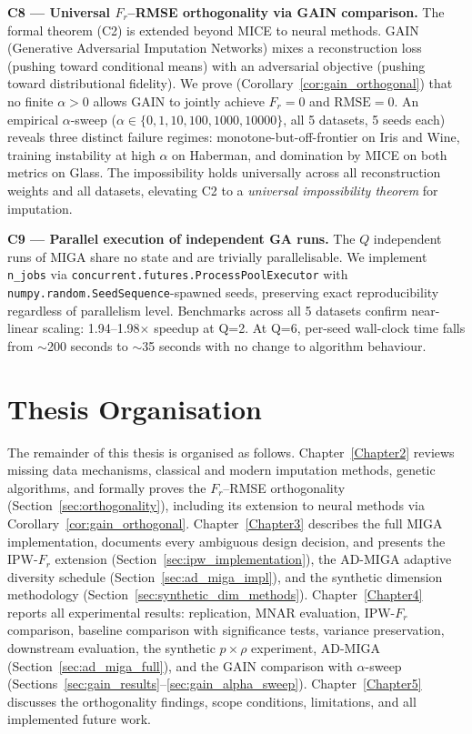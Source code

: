 \textbf{C8 --- Universal $F_r$--RMSE orthogonality via GAIN comparison.} The formal theorem (C2) is extended beyond MICE to neural methods. GAIN (Generative Adversarial Imputation Networks) mixes a reconstruction loss (pushing toward conditional means) with an adversarial objective (pushing toward distributional fidelity). We prove (Corollary~\ref{cor:gain_orthogonal}) that no finite $\alpha > 0$ allows GAIN to jointly achieve $F_r = 0$ and $\mathrm{RMSE} = 0$. An empirical $\alpha$-sweep ($\alpha \in \{0,1,10,100,1000,10000\}$, all 5 datasets, 5 seeds each) reveals three distinct failure regimes: monotone-but-off-frontier on Iris and Wine, training instability at high $\alpha$ on Haberman, and domination by MICE on both metrics on Glass. The impossibility holds universally across all reconstruction weights and all datasets, elevating C2 to a \emph{universal impossibility theorem} for imputation.

\textbf{C9 --- Parallel execution of independent GA runs.} The $Q$ independent runs of MIGA share no state and are trivially parallelisable. We implement \texttt{n\_jobs} via \texttt{concurrent.futures.ProcessPoolExecutor} with \texttt{numpy.random.SeedSequence}-spawned seeds, preserving exact reproducibility regardless of parallelism level. Benchmarks across all 5 datasets confirm near-linear scaling: 1.94--1.98$\times$ speedup at Q=2. At Q=6, per-seed wall-clock time falls from $\sim$200 seconds to $\sim$35 seconds with no change to algorithm behaviour.


\section{Thesis Organisation}

The remainder of this thesis is organised as follows. Chapter~\ref{Chapter2} reviews missing data mechanisms, classical and modern imputation methods, genetic algorithms, and formally proves the $F_r$--RMSE orthogonality (Section~\ref{sec:orthogonality}), including its extension to neural methods via Corollary~\ref{cor:gain_orthogonal}. Chapter~\ref{Chapter3} describes the full MIGA implementation, documents every ambiguous design decision, and presents the IPW-$F_r$ extension (Section~\ref{sec:ipw_implementation}), the AD-MIGA adaptive diversity schedule (Section~\ref{sec:ad_miga_impl}), and the synthetic dimension methodology (Section~\ref{sec:synthetic_dim_methods}). Chapter~\ref{Chapter4} reports all experimental results: replication, MNAR evaluation, IPW-$F_r$ comparison, baseline comparison with significance tests, variance preservation, downstream evaluation, the synthetic $p \times \rho$ experiment, AD-MIGA (Section~\ref{sec:ad_miga_full}), and the GAIN comparison with $\alpha$-sweep (Sections~\ref{sec:gain_results}--\ref{sec:gain_alpha_sweep}). Chapter~\ref{Chapter5} discusses the orthogonality findings, scope conditions, limitations, and all implemented future work.

